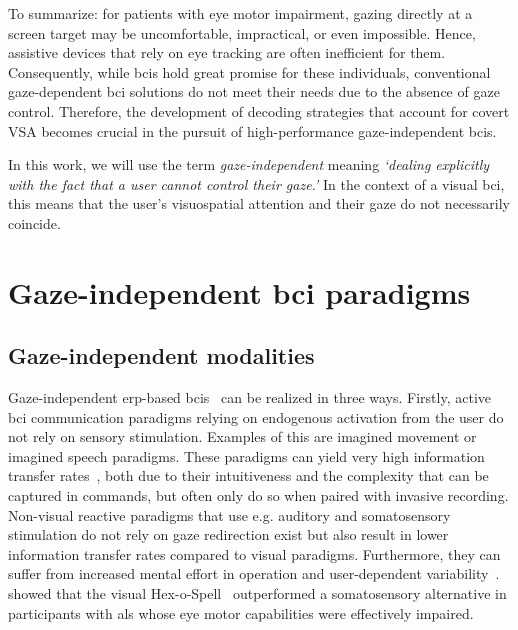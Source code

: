To summarize: for patients with eye motor impairment, gazing directly at a screen target may
be uncomfortable, impractical, or even impossible.
Hence, assistive devices that rely on eye tracking are often inefficient for
them.
Consequently, while \ac{bci}s hold great promise for these individuals, conventional
gaze-dependent \ac{bci} solutions do not meet their needs due to the absence of gaze
control.
Therefore, the development of decoding strategies that account for covert
VSA becomes crucial in the pursuit of high-performance gaze-independent
\ac{bci}s.

In this work, we will use the term \emph{gaze-independent} meaning
\emph{‘dealing explicitly with the fact that a user cannot control their
gaze.'}
In the context of a visual \ac{bci}, this means that the user's
visuospatial attention and their gaze do not necessarily coincide.



\section{Gaze-independent \ac{bci} paradigms}
\label{sec:gaze-independence}

\subsection{Gaze-independent modalities}
Gaze-independent \ac{erp}-based \ac{bci}s~\cite{Riccio2012, Aloise2012} can be realized in three
ways.
Firstly, active \ac{bci} communication paradigms relying on endogenous activation from the user
do not rely on sensory stimulation.
Examples of this are imagined movement or imagined speech paradigms.
These paradigms can yield very high information transfer
rates~\cite{Willett2021,Metzger2023}, both due to their intuitiveness and the
complexity that can be captured in commands, but often only do so when paired
with invasive recording.
Non-visual reactive paradigms that use e.g. auditory and
somatosensory
stimulation do not rely on gaze redirection exist but also result in lower information transfer
rates compared to visual paradigms.
Furthermore, they can suffer from increased mental effort in operation and
user-dependent variability~\cite{Severens2014,Reichert2020b}.
\textcite{Severens2014} showed that the visual Hex-o-Spell~\cite{Treder2010}
outperformed a somatosensory alternative in participants with \ac{als} whose
eye motor capabilities were effectively impaired.

